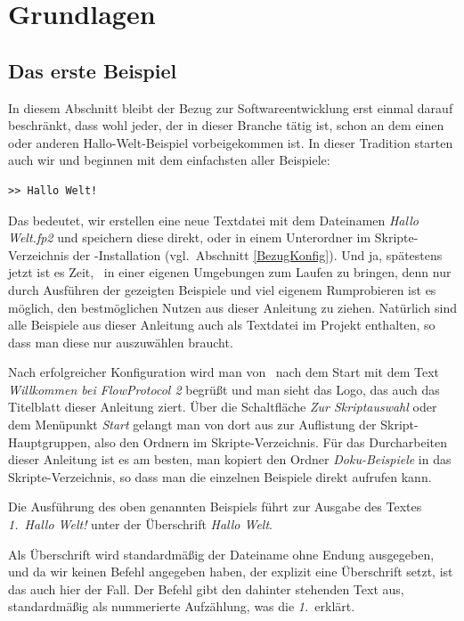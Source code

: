 \chapter{Grundlagen}
\section{Das erste Beispiel}
In diesem Abschnitt bleibt der Bezug zur Softwareentwicklung erst einmal darauf beschränkt, dass wohl jeder, der in dieser Branche tätig ist, schon an dem einen oder anderen Hallo-Welt-Beispiel vorbeigekommen ist. In dieser Tradition starten auch wir und beginnen mit dem einfachsten aller Beispiele:

\begin{verbatim}
>> Hallo Welt!
\end{verbatim}

Das bedeutet, wir erstellen eine neue Textdatei mit dem Dateinamen \emph{Hallo Welt.fp2} und speichern diese direkt, oder in einem Unterordner im Skripte-Verzeichnis der \FPZb-Installation (vgl.\ Abschnitt \ref{BezugKonfig}).  Und ja, spätestens jetzt ist es Zeit, \FPZ\ in einer eigenen Umgebungen zum Laufen zu bringen, denn nur durch Ausführen der gezeigten Beispiele und viel eigenem Rumprobieren ist es möglich, den bestmöglichen Nutzen aus dieser Anleitung zu ziehen. Natürlich sind alle Beispiele aus dieser Anleitung auch als Textdatei im Projekt enthalten, so dass man diese nur auszuwählen braucht.

Nach erfolgreicher Konfiguration wird man von \FPZ\ nach dem Start mit dem Text \emph{Willkommen bei FlowProtocol 2} begrüßt und man sieht das Logo, das auch das Titelblatt dieser Anleitung ziert. Über die Schaltfläche \emph{Zur Skriptauswahl} oder dem Menüpunkt \emph{Start} gelangt man von dort aus zur Auf\-lis\-tung der Skript-Hauptgruppen, also den Ordnern im Skripte-Verzeichnis. Für das Durcharbeiten dieser Anleitung ist es am besten, man kopiert den Ordner \emph{Doku-Beispiele} in das Skripte-Verzeichnis, so dass man die einzelnen Beispiele direkt aufrufen kann.

Die Ausführung des oben genannten Beispiels führt zur Ausgabe des Textes \emph{1.\ Hallo Welt!} unter der Überschrift \emph{Hallo Welt}.

Als Überschrift wird standardmäßig der Dateiname ohne Endung ausgegeben, und da wir keinen Befehl angegeben haben, der explizit eine Überschrift setzt, ist das auch hier der Fall. Der Befehl \cidxfrag{>\mbox{}>} gibt den dahinter stehenden Text aus, standardmäßig als nummerierte Aufzählung, was die \emph{1.}\ erklärt.

